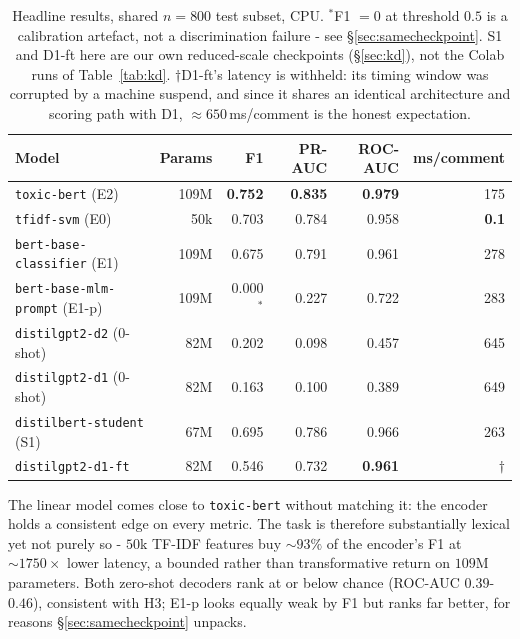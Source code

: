 \documentclass[10pt,a4paper]{article}
\begin{document}
\begin{table}[H]
\centering
\footnotesize
\setlength{\tabcolsep}{9pt}
\renewcommand{\arraystretch}{1.15}
\begin{tabular}{@{}l r r r r r@{}}
\toprule
\textbf{Model} & \textbf{Params} & \textbf{F1} & \textbf{PR-AUC} & \textbf{ROC-AUC} & \textbf{ms/comment} \\
\midrule
\texttt{toxic-bert} (E2)           & 109M & \textbf{0.752} & \textbf{0.835} & \textbf{0.979} & 175 \\
\rowcolor{rowgray}
\texttt{tfidf-svm} (E0)            & 50k  & 0.703 & 0.784 & 0.958 & \textbf{0.1} \\
\texttt{bert-base-classifier} (E1) & 109M & 0.675 & 0.791 & 0.961 & 278 \\
\rowcolor{rowgray}
\texttt{bert-base-mlm-prompt} (E1-p) & 109M & 0.000$^{*}$ & 0.227 & 0.722 & 283 \\
\texttt{distilgpt2-d2} (0-shot)    & 82M  & 0.202 & 0.098 & 0.457 & 645 \\
\rowcolor{rowgray}
\texttt{distilgpt2-d1} (0-shot)    & 82M  & 0.163 & 0.100 & 0.389 & 649 \\
\texttt{distilbert-student} (S1)   & 67M  & 0.695 & 0.786 & 0.966 & 263 \\
\rowcolor{rowgray}
\texttt{distilgpt2-d1-ft}          & 82M  & 0.546 & 0.732 & \textbf{0.961} & $\dagger$ \\
\bottomrule
\end{tabular}
\caption{Headline results, shared $n{=}800$ test subset, CPU.
$^{*}$F1 $=0$ at threshold $0.5$ is a calibration artefact, not a discrimination
failure - see \S\ref{sec:samecheckpoint}. S1 and D1-ft here are our own
reduced-scale checkpoints (\S\ref{sec:kd}), not the Colab runs of
Table~\ref{tab:kd}. $\dagger$D1-ft's latency is withheld: its timing window was
corrupted by a machine suspend, and since it shares an identical architecture
and scoring path with D1, ${\approx}650$\,ms/comment is the honest expectation.}
\label{tab:headline}
\end{table}

The linear model comes close to \texttt{toxic-bert} without matching it: the encoder
holds a consistent edge on every metric. The task is therefore substantially lexical
yet not purely so - $50$k TF-IDF features buy ${\sim}93\%$ of the encoder's F1 at
${\sim}1750\times$ lower latency, a bounded rather than transformative return on
$109$M parameters. Both zero-shot decoders rank at or below chance (ROC-AUC
$0.39$-$0.46$), consistent with H3; E1-p looks equally weak by F1 but ranks far
better, for reasons \S\ref{sec:samecheckpoint} unpacks.
\end{document}
